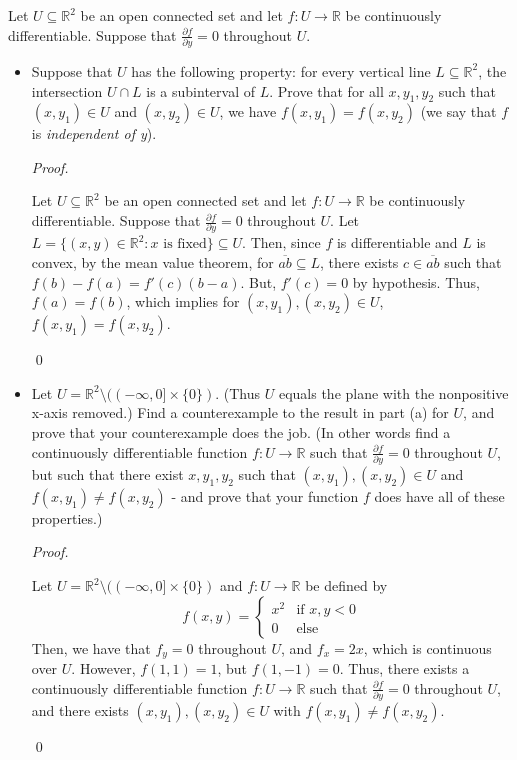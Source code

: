 \documentclass[12pt]{article}
\newenvironment{problem}[2][Problem]{\begin{trivlist}
\item[\hskip \labelsep {\bfseries #1}\hskip \labelsep {\bfseries
#2.}]}{\end{trivlist}}
\newenvironment{sol}
    {\emph{Proof.}
    }
    {
    \qed
    }
\begin{document}
\begin{problem}{2}
Let $U \subseteq \mathbb{R}^2$ be an open connected set and let $f : U \to \mathbb{R}$ be continuously differentiable. Suppose that $\frac{\partial f}{\partial y} = 0$ throughout $U$.
\begin{itemize}
  \item[(a)] Suppose that $U$ has the following property: for every vertical line $L \subseteq \mathbb{R}^2$, the intersection $U \cap L$ is a subinterval of $L$. Prove that for all $x, y_1, y_2$ such that $(x,y_1)\in U$ and $(x,y_2) \in U$, we have $f(x,y_1) = f(x,y_2)$ (we say that $f$ is \textit{independent of y}).
  
  \begin{sol}
    Let $U \subseteq \mathbb{R}^2$ be an open connected set and let $f : U \to \mathbb{R}$ be continuously differentiable. Suppose that $\frac{\partial f}{\partial y} = 0$ throughout $U$. Let $L = \{(x,y) \in \mathbb{R}^2 : x \text{ is fixed}\} \subseteq U$. Then, since $f$ is differentiable and $L$ is convex, by the mean value theorem, for $\overline{ab} \subseteq L$, there exists $c \in \overline{ab}$ such that $f(b) - f(a) = f'(c)(b-a)$. But, $f'(c) = 0$ by hypothesis. Thus, $f(a) = f(b)$, which implies for $(x,y_1),(x,y_2) \in U$, $f(x,y_1) = f(x,y_2)$.
  \end{sol}

  \item[(b)] Let $U = \mathbb{R}^2 \setminus ((-\infty,0] \times \{0\})$. (Thus $U$ equals the plane with the nonpositive x-axis removed.) Find a counterexample to the result in part (a)  for $U$, and prove that your counterexample does the job. (In other words find a continuously differentiable function $f : U \to \mathbb{R}$ such that $\frac{\partial f}{\partial y} = 0$ throughout $U$, but such that there exist $x,y_1,y_2$ such that $(x,y_1),(x,y_2) \in U$ and $f(x,y_1) \neq f(x,y_2)$ - and prove that your function $f$ does have all of these properties.)
  
  \begin{sol}
    Let $U = \mathbb{R}^2 \setminus ((-\infty,0] \times \{0\})$ and $f : U \to \mathbb{R}$ be defined by $$f(x,y) = \begin{cases} 
      x^2 & \text{if } x,y < 0 \\
      0 & \text{else}
   \end{cases}$$
   Then, we have that $f_y = 0$ throughout $U$, and $f_x = 2x$, which is continuous over $U$. However, $f(1,1) = 1$, but $f(1,-1) = 0$. Thus, there exists a continuously differentiable function $f : U \to \mathbb{R}$ such that $\frac{\partial f}{\partial y} = 0$ throughout $U$, and there exists $(x,y_1),(x,y_2) \in U$ with $f(x,y_1) \neq f(x,y_2)$.
  \end{sol}
\end{itemize}
\end{problem}
\end{document}
